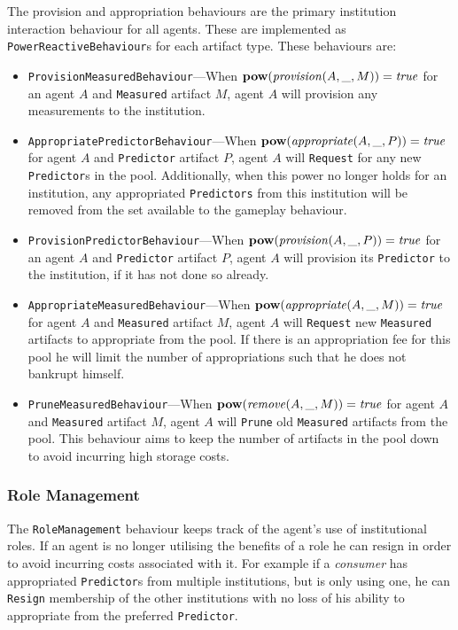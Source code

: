 The provision and appropriation behaviours are the primary institution
interaction behaviour for all agents. These are implemented as
\texttt{PowerReactiveBehaviour}s for each artifact type. These behaviours are:

\begin{itemize}
\item \texttt{ProvisionMeasuredBehaviour}---When $\mathbf{pow}(\mathit{provision}(A,\_,M)) = \mathit{true}$ for an agent $A$ and \texttt{Measured} artifact $M$, agent $A$ will provision any measurements to the institution.
\item \texttt{AppropriatePredictorBehaviour}---When $\mathbf{pow}(\mathit{appropriate}(A,\_,P)) = \mathit{true}$ for agent $A$ and \texttt{Predictor} artifact $P$, agent $A$ will \texttt{Request} for any new \texttt{Predictor}s in the pool. Additionally, when this power no longer holds for an institution, any appropriated \texttt{Predictors} from this institution will be removed from the set available to the gameplay behaviour.
\item \texttt{ProvisionPredictorBehaviour}---When $\mathbf{pow}(\mathit{provision}(A,\_,P)) = \mathit{true}$ for an agent $A$ and \texttt{Predictor} artifact $P$, agent $A$ will provision its \texttt{Predictor} to the institution, if it has not done so already.
\item \texttt{AppropriateMeasuredBehaviour}---When $\mathbf{pow}(\mathit{appropriate}(A,\_,M)) = \mathit{true}$ for agent $A$ and \texttt{Measured} artifact $M$, agent $A$ will \texttt{Request} new \texttt{Measured} artifacts to appropriate from the pool. If there is an appropriation fee for this pool he will limit the number of appropriations such that he does not bankrupt himself.
\item \texttt{PruneMeasuredBehaviour}---When $\mathbf{pow}(\mathit{remove}(A,\_,M)) = \mathit{true}$ for agent $A$ and \texttt{Measured} artifact $M$, agent $A$ will \texttt{Prune} old \texttt{Measured} artifacts from the pool. This behaviour aims to keep the number of artifacts in the pool down to avoid incurring high storage costs.
\end{itemize}

\subsubsection*{Role Management}

The \texttt{RoleManagement} behaviour keeps track of the agent's use of
institutional roles. If an agent is no longer utilising the benefits of a role
he can resign in order to avoid incurring costs associated with it. For
example if a \emph{consumer} has appropriated \texttt{Predictor}s from
multiple institutions, but is only using one, he can \texttt{Resign}
membership of the other institutions with no loss of his ability to
appropriate from the preferred \texttt{Predictor}.

